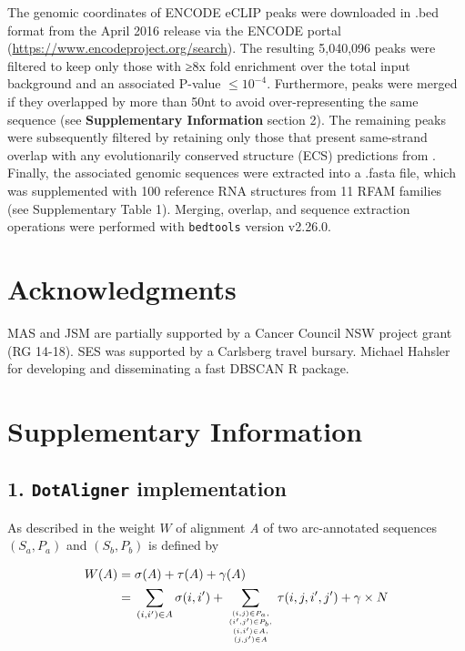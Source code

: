 \documentclass[a4paper,11pt]{article}
\newcommand\dotaligner{\texttt{DotAligner}}
\begin{document}
The genomic coordinates of ENCODE eCLIP peaks were downloaded in .bed format from the April 2016 release via the ENCODE portal (\url{https://www.encodeproject.org/search}). The resulting 5,040,096 peaks 
were filtered to keep only those with ≥8x fold enrichment over the total input background and an associated P-value  $\leq10^{-4}$. Furthermore, peaks were merged if they overlapped by more than 50nt to avoid over-representing the same sequence (see \textbf{Supplementary Information }section 2). The remaining peaks were subsequently filtered by 
retaining only those that present same-strand overlap with any evolutionarily conserved structure (ECS) predictions from \cite{smith2013widespread}. Finally, the associated genomic sequences were extracted into a .fasta file, which was supplemented with 100 reference RNA structures from 11 RFAM families (see Supplementary Table 1). 
Merging, overlap, and sequence extraction operations were performed with \texttt{bedtools} version v2.26.0.



\section*{ Acknowledgments }
MAS and JSM are partially supported  by a Cancer Council NSW project grant (RG 14-18). 
SES was supported by a Carlsberg travel bursary. 
Michael Hahsler for developing and disseminating a fast DBSCAN R package.

 


\newpage 
\section*{ Supplementary Information }

\subsection*{ 1. \dotaligner{} implementation }
\noindent As described in \cite{Palu2010} the weight $W$ of alignment \emph{A}
of two arc-annotated sequences $(S_a,P_a)$ and $(S_b,P_b)$ is defined by

\begin{equation}\label{eq1}
\begin{aligned}
	W(A) ={} & \sigma(A) + \tau(A) + \gamma(A) \\
	     ={} & \sum_{(i,i^\prime) \in A} \sigma(i,i^\prime) + \sum_{(i,j) \in
	P_a,\atop {(i^\prime,j^\prime) \in P_b,\atop {(i,i^\prime) \in
	A,\atop (j,j^\prime) \in A}}} \tau(i,j,i^\prime,j^\prime) + \gamma
	\times N
\end{aligned}
\end{equation}
\end{document}
